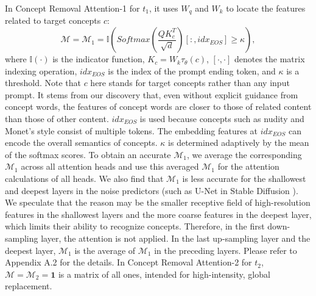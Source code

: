 In Concept Removal Attention-1 for $t_1$, it uses $W_q$ and $W_k$ to locate the features related to target concepts $c$:
\begin{equation}
    \mathcal{M}=\mathcal{M}_1 = \mathbb{I}(Softmax(\frac{QK_c^T}{\sqrt{d}})[:, idx_{EOS}] \geq \kappa),
\end{equation}
where $\mathbb{I}(\cdot)$ is the indicator function, $K_c=W_k\tau_\theta(c)$, $[\cdot, \cdot]$ denotes the matrix indexing operation, $idx_{EOS}$ is the index of the prompt ending token, and $\kappa$ is a threshold. Note that $c$ here stands for target concepts rather than any input prompt. It stems from our discovery that, even without explicit guidance from concept words, the features of concept words are closer to those of related content than those of other content. $idx_{EOS}$ is used because concepts such as nudity and Monet's style consist of multiple tokens. The embedding features at $idx_{EOS}$ can encode the overall semantics of concepts. $\kappa$ is determined adaptively by the mean of the softmax scores. To obtain an accurate $\mathcal{M}_1$, we average the corresponding $\mathcal{M}_1$ across all attention heads and use this averaged $\mathcal{M}_1$ for the attention calculations of all heads. We also find that $\mathcal{M}_1$ is less accurate for the shallowest and deepest layers in the noise predictors (such as U-Net \cite{ronneberger2015u} in Stable Diffusion \cite{rombach2022high}). We speculate that the reason may be the smaller receptive field of high-resolution features in the shallowest layers and the more coarse features in the deepest layer, which limits their ability to recognize concepts. Therefore, in the first down-sampling layer, the attention is not applied. In the last up-sampling layer and the deepest layer, $\mathcal{M}_1$ is the average of $\mathcal{M}_1$ in the preceding layers. Please refer to Appendix A.2 for the details. In Concept Removal Attention-2 for $t_2$, $\mathcal{M}=\mathcal{M}_2=\mathbf{1}$ is a matrix of all ones, intended for high-intensity, global replacement.


